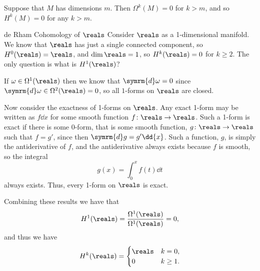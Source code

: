 \documentclass[fleqn]{NotesClass}
\renewcommand{\dl}{\symrm{d}}
\begin{document}
    \begin{exm}{}{}
        Suppose that \(M\) has dimensions \(m\).
        Then \(\Omega^k(M) = 0\) for \(k > m\), and so \(H^k(M) = 0\) for any \(k > m\).
    \end{exm}
    
    \begin{exm}{de Rham Cohomology of \(\reals\)}{}
        Consider \(\reals\) as a 1-dimensional manifold.
        We know that \(\reals\) has just a single connected component, so \(H^0(\reals) = \reals\), and \(\dim \reals = 1\), so \(H^k(\reals) = 0\) for \(k \ge 2\).
        The only question is what is \(H^1(\reals)\)?
        
        If \(\omega \in \Omega^1(\reals)\) then we know that \(\dl \omega = 0\) since \(\dl \omega \in \Omega^2(\reals) = 0\), so all \(1\)-forms on \(\reals\) are closed.
        
        Now consider the exactness of 1-forms on \(\reals\).
        Any exact 1-form may be written as \(f \dd{x}\) for some smooth function \(f \colon \reals \to \reals\).
        Such a 1-form is exact if there is some 0-form, that is some smooth function, \(g \colon \reals \to \reals\) such that \(f = g'\), since then \(\dl g = g' \dd{x}\).
        Such a function, \(g\), is simply the antiderivative of \(f\), and the antiderivative always exists because \(f\) is smooth, so the integral
        \begin{equation}
            g(x) = \int_0^x f(t) \dd{t}
        \end{equation}
        always exists.
        Thus, every 1-form on \(\reals\) is exact.
        
        Combining these results we have that
        \begin{equation}
            H^1(\reals) = \frac{\Omega^1(\reals)}{\Omega^1(\reals)} = 0,
        \end{equation}
        and thus we have
        \begin{equation}
            H^k(\reals) = 
            \begin{cases}
                \reals & k = 0,\\
                0 & k \ge 1.
            \end{cases}
        \end{equation}
    \end{exm}
    
\end{document}

